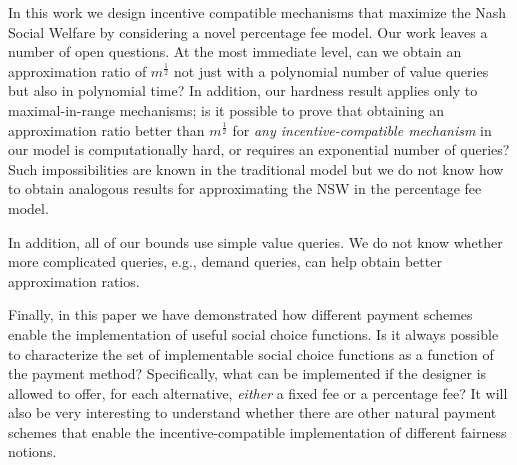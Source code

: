 \documentclass{theoretics}
\begin{document}
In this work we design incentive compatible mechanisms that maximize the Nash Social Welfare by considering a novel percentage fee model. Our work leaves a number of open questions. At the most immediate level, can we obtain an approximation ratio of $m^{\frac 1 2}$ not just with a polynomial number of value queries but also in polynomial time? In addition, our hardness result applies only to maximal-in-range mechanisms; is it possible to prove that obtaining an approximation ratio better than $m^\frac 1 2$ for {\em any incentive-compatible mechanism} in our model is computationally hard, or requires an exponential number of queries? Such impossibilities are known in the traditional model \cite{D11,DV11,DV12} but we do not know how to obtain analogous results for approximating the NSW in the percentage fee model.

In addition, all of our bounds use simple value queries. We do not know whether more complicated queries, e.g., demand queries, can help obtain better approximation ratios.

Finally, in this paper we have demonstrated how different payment schemes enable the implementation of useful social choice functions. Is it always possible to characterize the set of implementable social choice functions as a function of the payment method? Specifically, what can be implemented if the designer is allowed to offer, for each alternative, \emph{either} a fixed fee or a percentage fee? It will also be very interesting to understand whether there are other natural payment schemes that enable the incentive-compatible implementation of different fairness notions.

\printbibliography    
\end{document}
